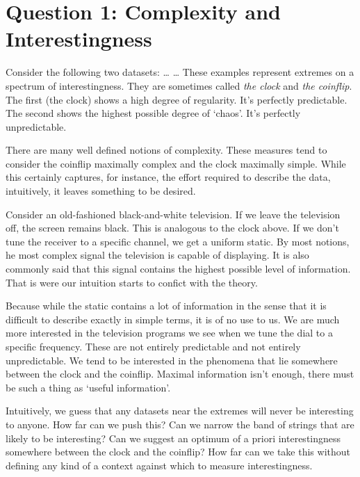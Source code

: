 \documentclass{article}
\begin{document}
\section{Question 1: Complexity and Interestingness}

Consider the  following two datasets:
\ldots
{}\ldots
These examples represent extremes on a spectrum of interestingness. They are
sometimes called \emph{the clock} and \emph{the coinflip}. The first (the clock)
shows a high degree of regularity. It's perfectly predictable. The second shows
the highest possible degree of `chaos'. It's perfectly unpredictable.

There are many well defined notions of complexity. These measures tend to consider the coinflip maximally
complex and the clock maximally simple. While this certainly captures, for
instance, the effort required to describe the data, intuitively, it leaves
something to be desired.

Consider an old-fashioned black-and-white television. If we leave the
television off, the screen remains black. This is analogous to the clock above.
If we don't tune the receiver to a specific channel, we get a uniform static. By
most notions, he most complex signal the television is capable of displaying. It
is also commonly said that this signal contains the highest possible level of
information. That is were our intuition starts to confict with the theory.

Because while the static contains a lot of information in the sense that it is
difficult to describe exactly in simple terms, it is of no use to us. We are
much more interested in the television programs we see when we tune the dial to
a specific frequency. These are not entirely predictable and not entirely
unpredictable. We tend to be interested in the phenomena that lie somewhere
between the clock and the coinflip. Maximal information isn't enough, there must
be such a thing as `useful information'.

Intuitively, we guess that any datasets near the extremes will never be
interesting to anyone. How far can we push this? Can we narrow the band of
strings that are likely to be interesting? Can we suggest an optimum of a priori
interestingness somewhere between the clock and the coinflip? How far can we
take this without defining any kind of a context against which to measure
interestingness.
\end{document}
